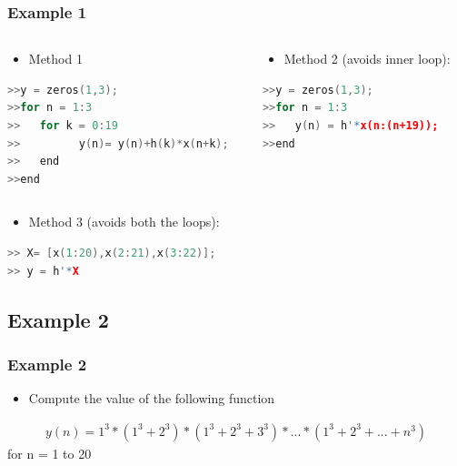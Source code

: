 \documentclass[hyperref={pdfpagelabels=true}]{beamer}
\begin{document}
\begin{frame}[fragile]
\frametitle{Example 1}
\begin{columns}
    \begin{column}{0.58\textwidth}
        \begin{itemize}
         \item[\ding{71}] Method 1 
         \end{itemize}
\begin{tcolorbox}
\scriptsize{
\begin{lstlisting}[language=C++,basicstyle=\ttfamily,keywordstyle=\color{red}]
>>y = zeros(1,3);
>>for n = 1:3
>>   for k = 0:19
>>         y(n)= y(n)+h(k)*x(n+k);
>>   end
>>end
\end{lstlisting} }
\end{tcolorbox}
      \end{column}
    \begin{column}{0.38\textwidth}
        \begin{itemize}
         \item[\ding{71}] Method 2 (avoids inner loop):
         \end{itemize}
\tiny{
\begin{lstlisting}[language=C++,basicstyle=\ttfamily,keywordstyle=\color{red}]
>>y = zeros(1,3);
>>for n = 1:3
>>   y(n) = h'*x(n:(n+19));
>>end
\end{lstlisting}}
    \end{column}
\end{columns}
\begin{itemize}
         \item[\ding{71}] Method 3 (avoids both the loops):
         \end{itemize}
\begin{lstlisting}[language=C++,basicstyle=\ttfamily,keywordstyle=\color{red}]
>> X= [x(1:20),x(2:21),x(3:22)];
>> y = h'*X
\end{lstlisting}
\end{frame}

\subsection{Example 2} 
\begin{frame}[fragile]
\frametitle{Example 2}
\begin{itemize}
\item[\ding{90}] Compute the value of the following function
\end{itemize}
\small{
\begin{align*}
y(n)=1^3*(1^3+2^3 )*(1^3+2^3+3^3 )*...*(1^3+2^3+ ...+n^3 )
\end{align*}}
for n = 1 to 20
\end{frame}
\end{document}
